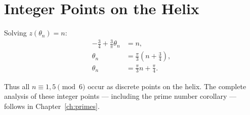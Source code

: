\section{Integer Points on the Helix}

Solving $z(\theta_n) = n$:
\begin{align}
-\frac{3}{4} + \frac{3}{\pi}\theta_n &= n, \\
\theta_n &= \frac{\pi}{3}\left(n + \frac{3}{4}\right), \\
\theta_n &= \frac{\pi}{3}n + \frac{\pi}{4}.
\end{align}

Thus all $n \equiv 1,5 \pmod{6}$ occur as discrete points on the helix.
The complete analysis of these integer points --- including the prime number
corollary --- follows in Chapter~\ref{ch:primes}.
